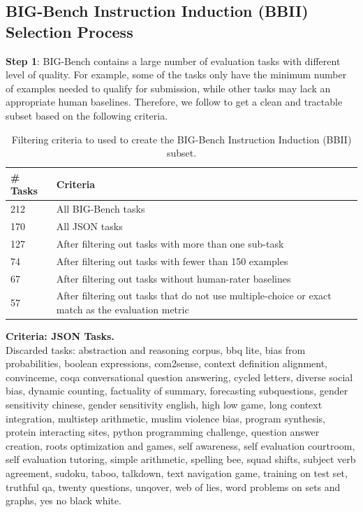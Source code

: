 \clearpage
\newpage
\subsection{BIG-Bench Instruction Induction (BBII) Selection Process}
\textbf{Step 1}: BIG-Bench contains a large number of evaluation tasks with different level of quality. For example, some of the tasks only have the minimum number of examples needed to qualify for submission, while other tasks may lack an appropriate human baselines. Therefore, we follow \citet{suzgun2022challenging} to get a clean and tractable subset based on the following criteria.
\begin{table}[H]
\vspace{-0.06in}
\caption{Filtering criteria to used to create the BIG-Bench Instruction Induction (BBII) subset.}
\label{table:bbii_filtering}
\vspace{-0.08in}
\small
\centering
\begin{tabular}{m{1cm}m{12cm}}
\toprule
\textbf{\# Tasks} & \textbf{Criteria} \\
\midrule
212 & All BIG-Bench tasks \\
170 & All JSON tasks \\
127 & After filtering out tasks with more than one sub-task \\
74 & After filtering out tasks with fewer than 150 examples \\
67 & After filtering out tasks without human-rater baselines \\
57 & After filtering out tasks that do not use multiple-choice or exact match as the evaluation metric \\
\bottomrule
\end{tabular}
\vspace{-0.1in}
\end{table}

\textbf{Criteria: JSON Tasks.}\\
Discarded tasks: abstraction and reasoning corpus, bbq lite, bias from probabilities, boolean expressions, com2sense, context definition alignment, convinceme, coqa conversational question answering, cycled letters, diverse social bias, dynamic counting, factuality of summary, forecasting subquestions, gender sensitivity chinese, gender sensitivity english, high low game, long context integration, multistep arithmetic, muslim violence bias, program synthesis, protein interacting sites, python programming challenge, question answer creation, roots optimization and games, self awareness, self evaluation courtroom, self evaluation tutoring, simple arithmetic, spelling bee, squad shifts, subject verb agreement, sudoku, taboo, talkdown, text navigation game, training on test set, truthful qa, twenty questions, unqover, web of lies, word problems on sets and graphs, yes no black white.

